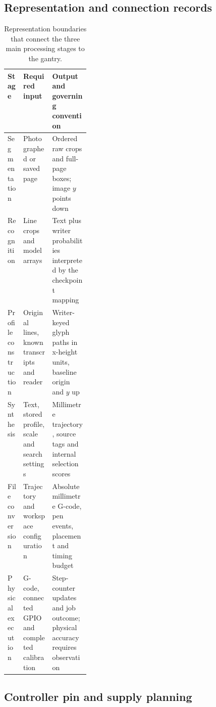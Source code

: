 \subsection{Representation and connection records}
\begin{table}[H]\centering\small
\begin{tabularx}{\linewidth}{|p{0.19\linewidth}|X|X|}
\hline\textbf{Stage}&\textbf{Required input}&\textbf{Output and governing convention}\\\hline
Segmentation&Photographed or saved page&Ordered raw crops and full-page boxes; image $y$ points down\\\hline
Recognition&Line crops and model arrays&Text plus writer probabilities interpreted by the checkpoint mapping\\\hline
Profile construction&Original lines, known transcripts and reader&Writer-keyed glyph paths in x-height units, baseline origin and $y$ up\\\hline
Synthesis&Text, stored profile, scale and search settings&Millimetre trajectory, source tags and internal selection scores\\\hline
File conversion&Trajectory and workspace configuration&Absolute millimetre G-code, pen events, placement and timing budget\\\hline
Physical execution&G-code, connected GPIO and completed calibration&Step-counter updates and job outcome; physical accuracy requires observation\\\hline
\end{tabularx}
\caption{Representation boundaries that connect the three main processing stages to the gantry.}
\label{tab:des-contracts}
\end{table}
\subsection{Controller pin and supply planning}

